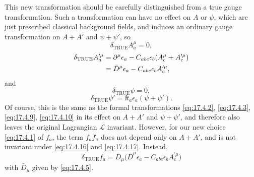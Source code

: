 This new transformation should be carefully distinguished from a true gauge
transformation. Such a transformation can have no effect on $A$ or $\psi$,
which are just prescribed classical background fields, and induces an
ordinary gauge transformation on $A+A'$ and $\psi+\psi'$, so
\begin{equation}
\delta_{\mathrm{TRUE}}A_a^\mu=0,
\label{eq:17.4.16}
\end{equation}
\begin{align}
\delta_{\mathrm{TRUE}}A_a^{\prime\mu}
&=\partial^\mu\epsilon_a
-C_{abc}\epsilon_b
(A_c^\mu+A_c^{\prime\mu}) \notag\\
&=\bar D^\mu\epsilon_a
-C_{abc}\epsilon_b A_c^{\prime\mu},
\label{eq:17.4.17}
\end{align}
and
\begin{equation}
\delta_{\mathrm{TRUE}}\psi=0,
\label{eq:17.4.18}
\end{equation}
\begin{equation}
\delta_{\mathrm{TRUE}}\psi'
=\ii t_a\epsilon_a(\psi+\psi').
\label{eq:17.4.19}
\end{equation}
Of course, this is the same as the formal transformations
\eqref{eq:17.4.2}, \eqref{eq:17.4.3}, \eqref{eq:17.4.9},
\eqref{eq:17.4.10} in its effect on $A+A'$ and $\psi+\psi'$, and therefore
also leaves the original Lagrangian $\mathcal L$ invariant. However, for our
new choice \eqref{eq:17.4.1} of $f_a$, the term $f_a f_a$ does
not depend only on $A+A'$, and is not invariant under \eqref{eq:17.4.16}
and \eqref{eq:17.4.17}. Instead,
\begin{equation}
\delta_{\mathrm{TRUE}}f_a
=\bar D_\mu\bigl(\bar D^\mu\epsilon_a
-C_{abc}\epsilon_b A_c^{\prime\mu}\bigr)
\label{eq:17.4.20}
\end{equation}
with $\bar D_\mu$ given by \eqref{eq:17.4.5}.


